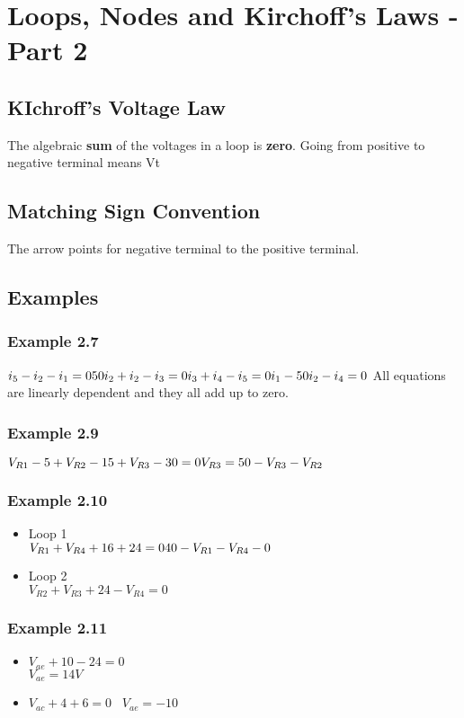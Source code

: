\documentclass[12pt]{article}
\begin{document}
\section{Loops, Nodes and Kirchoff's Laws - Part 2}
\subsection{KIchroff's Voltage Law}
The algebraic \textbf{sum} of the voltages in a loop is \textbf{zero}.
Going from positive to negative terminal means Vt
\subsection{Matching Sign Convention}
The arrow points for negative terminal to the positive terminal.
\subsection{Examples}
\subsubsection{Example 2.7}
$
i_5-i_2-i_1=0 \\
50i_2+i_2-i_3=0 \\
i_3+i_4-i_5=0 \\
i_1-50i_2-i_4=0 \\
$
All equations are linearly dependent and they all add up to zero.
\subsubsection{Example 2.9}
$V_{R1}-5+V_{R2}-15+V_{R3}-30=0 \\
V_{R3}=50-V_{R3}-V_{R2}$
\subsubsection{Example 2.10}
\begin{itemize}
\item Loop 1 \\
$V_{R1}+V_{R4}+16+24=0 \\
40-V_{R1}-V_{R4}-0$ \\
\item Loop 2 \\
$V_{R2}+V_{R3}+24-V_{R4}=0$
\end{itemize}
\subsubsection{Example 2.11}
\begin{itemize}
\item
$V_{ae}+10-24=0$ \\
$V_{ae}=14 V$
\item
$V_{ac}+4+6=0$ \
$V_{ae}=-10$
\end{itemize}
\end{document}
